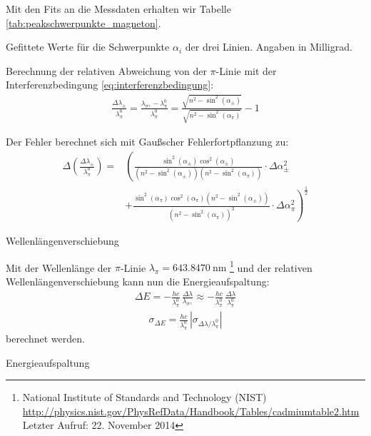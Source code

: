 \documentclass[11pt, a4paper]{article}
\begin{document}
Mit den Fits an die Messdaten erhalten wir Tabelle \ref{tab:peakschwerpunkte_magneton}.

\begin{table}[h]
	\centering
	\resizebox{\columnwidth}{!}{%
		}
	\caption{Gefittete Werte für die Schwerpunkte $\alpha_i$ der drei Linien. Angaben in Milligrad.}
	\label{tab:peakschwerpunkte_magneton}
\end{table}

Berechnung der relativen Abweichung von der $\pi$-Linie mit der Interferenzbedingung \ref{eq:interferenzbedingung}:
\begin{align}
	\frac{\Delta \lambda_\pm}{\lambda_\pi^0} = \frac{\lambda_{\sigma^\pm} - \lambda_\pi^0}{\lambda_\pi^0} = \frac{\sqrt{n^2 - \sin^2(\alpha_{\pm})}}{\sqrt{n^2 - \sin^2(\alpha_\pi)}} - 1
\end{align}

Der Fehler berechnet sich mit Gaußscher Fehlerfortpflanzung zu:
\begin{align}
	\Delta \left( \frac{\Delta \lambda_\pm}{\lambda_\pi^0} \right) = & \left( \frac{\sin^2(\alpha_\pm) \cos^2(\alpha_\pm)}{(n^2-\sin^2(\alpha_\pm))(n^2-\sin^2(\alpha_\pi))} \cdot \Delta \alpha_\pm^2 \right. \nonumber\\
	& \left. + \frac{\sin^2(\alpha_\pi) \cos^2(\alpha_\pi) (n^2 - \sin^2(\alpha_\pm))}{(n^2-\sin^2(\alpha_\pi))^3} \cdot \Delta \alpha_\pi^2\right)^\frac{1}{2}
\end{align}

\begin{table}[h]
	\centering
	
	\caption{Wellenlängenverschiebung}
	\label{tab:verschiebung_wellenlaenge}
\end{table}
Mit der Wellenlänge der $\pi$-Linie $\lambda_\pi = \SI{643,8470}{\nano\metre}$ \footnote{National Institute of Standards and Technology (NIST)\\ \url{http://physics.nist.gov/PhysRefData/Handbook/Tables/cadmiumtable2.htm}\\Letzter Aufruf: 22. November 2014} und der relativen Wellenlängenverschiebung kann nun die Energieaufspaltung:
\begin{align}
	\Delta E = -\frac{h c}{\lambda_\pi^0}\,\frac{\Delta \lambda}{\lambda_{\sigma^\pm}} \approx -\frac{h c}{\lambda_\pi^0}\,\frac{\Delta \lambda}{\lambda_\pi^0}
\end{align}
\begin{align}
	\sigma_{\Delta E} = \frac{h c}{\lambda_\pi^0} \, | \sigma_{\Delta \lambda / \lambda_\pi^0} |
\end{align}
berechnet werden.
\begin{table}[h]
	\centering
	
	\caption{Energieaufspaltung}
	\label{tab:energieaufspaltung}
\end{table}
\end{document}

